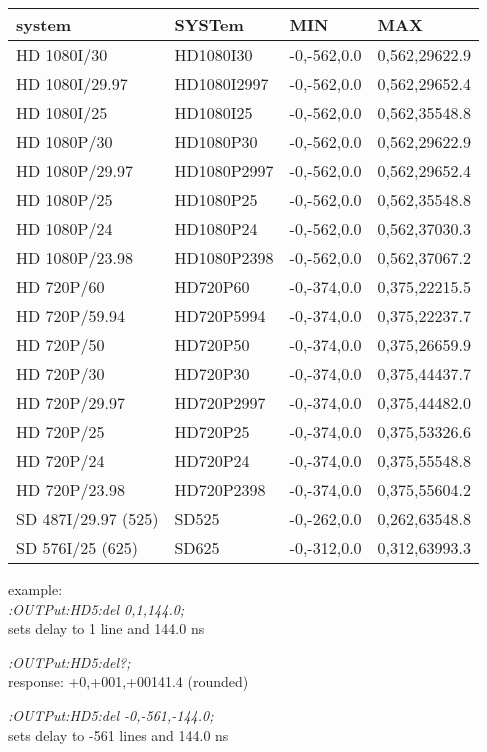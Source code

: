 \begin{tabular}{l l l l}
system         &     SYSTem     &     MIN      &       MAX\\
\hline
HD 1080I/30        &  HD1080I30    & -0,-562,0.0 & 0,562,29622.9\\
HD 1080I/29.97     &  HD1080I2997  & -0,-562,0.0 & 0,562,29652.4\\
HD 1080I/25        &  HD1080I25    & -0,-562,0.0 & 0,562,35548.8\\
HD 1080P/30        &  HD1080P30    & -0,-562,0.0 & 0,562,29622.9\\
HD 1080P/29.97     &  HD1080P2997  & -0,-562,0.0 & 0,562,29652.4\\
HD 1080P/25        &  HD1080P25    & -0,-562,0.0 & 0,562,35548.8\\
HD 1080P/24        &  HD1080P24    & -0,-562,0.0 & 0,562,37030.3\\
HD 1080P/23.98     &  HD1080P2398  & -0,-562,0.0 & 0,562,37067.2\\
HD 720P/60         &  HD720P60     & -0,-374,0.0 & 0,375,22215.5\\
HD 720P/59.94      &  HD720P5994   & -0,-374,0.0 & 0,375,22237.7\\
HD 720P/50         &  HD720P50     & -0,-374,0.0 & 0,375,26659.9\\
HD 720P/30         &  HD720P30     & -0,-374,0.0 & 0,375,44437.7\\
HD 720P/29.97      &  HD720P2997   & -0,-374,0.0 & 0,375,44482.0\\
HD 720P/25         &  HD720P25     & -0,-374,0.0 & 0,375,53326.6\\
HD 720P/24         &  HD720P24     & -0,-374,0.0 & 0,375,55548.8\\
HD 720P/23.98      &  HD720P2398   & -0,-374,0.0 & 0,375,55604.2\\
SD 487I/29.97 (525)&  SD525        & -0,-262,0.0 & 0,262,63548.8\\
SD 576I/25 (625)   &  SD625        & -0,-312,0.0 & 0,312,63993.3\\
\end{tabular}

example:\\
\textit{:OUTPut:HD5:del 0,1,144.0;}\\
sets delay to 1 line and 144.0 ns

\textit{:OUTPut:HD5:del?;}\\ 
response: +0,+001,+00141.4 (rounded)

\textit{:OUTPut:HD5:del -0,-561,-144.0;}\\
sets delay to -561 lines and 144.0 ns

